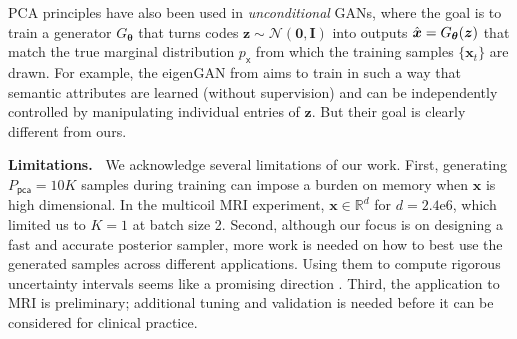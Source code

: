 \documentclass{article}
\theoremstyle{plain}
\theoremstyle{definition}
\theoremstyle{remark}
\newcommand{\hvec}[1]{\ensuremath{\Hat{\boldsymbol{#1}}}}
\renewcommand{\vec}[1]{\ensuremath{\boldsymbol{#1}}}
\newcommand{\mc}[1]{\ensuremath{\mathcal{#1}}}
\newcommand{\Real}{{\mathbb{R}}}
\newcommand{\eig}{_{\mathsf{pca}}}
\newcommand{\px}{p_{\mathsf{x}}}
\begin{document}
PCA principles have also been used in \emph{unconditional} GANs, where the goal is to train a generator $G_{\vec{\theta}}$ that turns codes $\vec{z}\sim\mc{N}(\vec{0},\vec{I})$ into outputs $\hvec{x}=G_{\vec{\theta}}(\vec{z})$ that match the true marginal distribution $\px$ from which the training samples $\{\vec{x}_t\}$ are drawn.
For example, the eigenGAN from \cite{He:ICCV:21} aims to train in such a way that semantic attributes are learned (without supervision) and can be independently controlled by manipulating individual entries of $\vec{z}$.
But their goal is clearly different from ours.
  
\textbf{Limitations.~} 
We acknowledge several limitations of our work.
First, generating $P\eig = 10K$ samples during training can impose a burden on memory when $\vec{x}$ is high dimensional.
In the multicoil MRI experiment, $\vec{x}\in\Real^d$ for $d=2.4\mathrm{e}6$, which limited us to $K=1$ at batch size 2.
Second, although our focus is on designing a fast and accurate posterior sampler, more work is needed on how to best use the generated samples across different applications. 
Using them to compute rigorous uncertainty intervals seems like a promising direction \cite{Angelopoulos:ICML:22,Teneggi:ICML:23,Narnhofer:JIS:24}.
Third, the application to MRI is preliminary; additional tuning and validation is needed before it can be considered for clinical practice.

\end{document}
